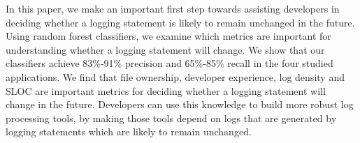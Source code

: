 In this paper, we make an important first step towards assisting developers in deciding whether a logging statement is likely to remain unchanged in the future. Using random forest classifiers, we examine which metrics are important for understanding whether a logging statement will change. 
We show that our classifiers achieve 83\%-91\% precision and 65\%-85\% recall in the four studied applications. We find that file ownership, developer experience, log density and SLOC are important metrics for deciding whether a logging statement will change in the future. Developers can use this knowledge to build more robust log processing tools, by making those tools depend on logs that are generated by logging statements which are likely to remain unchanged.








